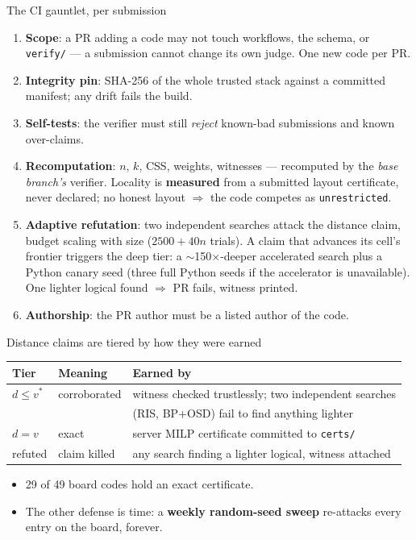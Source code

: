 \documentclass[11pt,aspectratio=169]{beamer}
\newcommand{\code}[1]{\texttt{\small #1}}
\begin{document}
\begin{frame}{The CI gauntlet, per submission}
  \small
  \begin{enumerate}\setlength{\itemsep}{5pt}
    \item \textbf{Scope}: a PR adding a code may not touch workflows, the schema,
          or \code{verify/} --- a submission cannot change its own judge.
          One new code per PR.
    \item \textbf{Integrity pin}: SHA-256 of the whole trusted stack against a
          committed manifest; any drift fails the build.
    \item \textbf{Self-tests}: the verifier must still \emph{reject} known-bad
          submissions and known over-claims.
    \item \textbf{Recomputation}: $n$, $k$, CSS, weights, witnesses --- recomputed
          by the \emph{base branch's} verifier. Locality is \textbf{measured}
          from a submitted layout certificate, never declared; no honest
          layout $\Rightarrow$ the code competes as \code{unrestricted}.
    \item \textbf{Adaptive refutation}: two independent searches attack the
          distance claim, budget scaling with size ($2500 + 40n$ trials).
          A claim that advances its cell's frontier triggers the deep tier:
          a $\sim$150$\times$-deeper accelerated search plus a Python canary
          seed (three full Python seeds if the accelerator is unavailable).
          One lighter logical found $\Rightarrow$ PR fails, witness printed.
    \item \textbf{Authorship}: the PR author must be a listed author of the code.
  \end{enumerate}
\end{frame}

\begin{frame}{Distance claims are tiered by how they were earned}
  \centering
  \renewcommand{\arraystretch}{1.5}
  \begin{tabular}{@{}lll@{}}
    \toprule
    \textbf{Tier} & \textbf{Meaning} & \textbf{Earned by} \\
    \midrule
    {\color{ink}$d \le v^{*}$} & corroborated & witness checked trustlessly; two independent searches
      \\[-3pt] & & (RIS, BP+OSD) fail to find anything lighter \\
    {\color{trust}$d = v$} & exact & server MILP certificate committed to \code{certs/} \\
    {\color{flag}refuted} & claim killed & any search finding a lighter logical, witness attached \\
    \bottomrule
  \end{tabular}

  \vspace{12pt}
  \begin{itemize}
    \item 29 of 49 board codes hold an exact certificate.
    \item The other defense is time: a \textbf{weekly random-seed sweep}
          re-attacks every entry on the board, forever.
  \end{itemize}
\end{frame}
\end{document}
